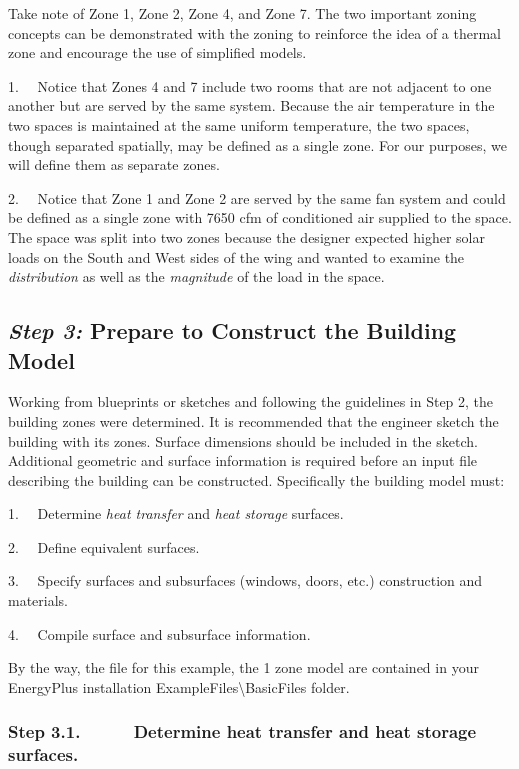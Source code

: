 Take note of Zone 1, Zone 2, Zone 4, and Zone 7. The two important zoning concepts can be demonstrated with the zoning to reinforce the idea of a thermal zone and encourage the use of simplified models.

1.~~ Notice that Zones 4 and 7 include two rooms that are not adjacent to one another but are served by the same system. Because the air temperature in the two spaces is maintained at the same uniform temperature, the two spaces, though separated spatially, may be defined as a single zone. For our purposes, we will define them as separate zones.

2.~~ Notice that Zone 1 and Zone 2 are served by the same fan system and could be defined as a single zone with 7650 cfm of conditioned air supplied to the space. The space was split into two zones because the designer expected higher solar loads on the South and West sides of the wing and wanted to examine the \emph{distribution} as well as the \emph{magnitude} of the load in the space.

\subsection{\texorpdfstring{\emph{Step 3:} Prepare to Construct the Building Model}{Step 3: Prepare to Construct the Building Model}}\label{step-3-prepare-to-construct-the-building-model}

Working from blueprints or sketches and following the guidelines in Step 2, the building zones were determined. It is recommended that the engineer sketch the building with its zones. Surface dimensions should be included in the sketch. Additional geometric and surface information is required before an input file describing the building can be constructed. Specifically the building model must:

1.~~ Determine \emph{heat transfer} and \emph{heat storage} surfaces.

2.~~ Define equivalent surfaces.

3.~~ Specify surfaces and subsurfaces (windows, doors, etc.) construction and materials.

4.~~ Compile surface and subsurface information.

By the way, the file for this example, the 1 zone model are contained in your EnergyPlus installation ExampleFiles\textbackslash{}BasicFiles folder.

\subsubsection{Step 3.1.~~~~~ Determine heat transfer and heat storage surfaces.}\label{step-3.1.-determine-heat-transfer-and-heat-storage-surfaces.}

